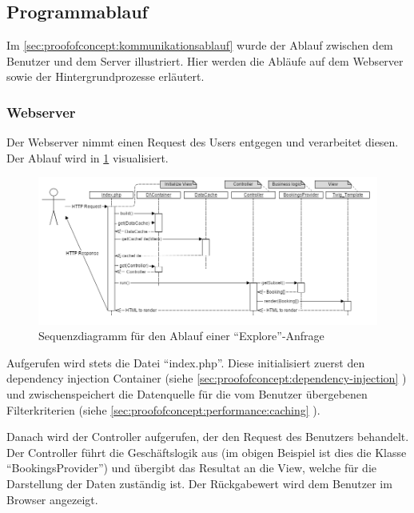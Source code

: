\subsection{Programmablauf}
\label{sec:proofofconcept:programmablauf}
Im \cref{sec:proofofconcept:kommunikationsablauf} wurde der Ablauf zwischen dem Benutzer und dem Server illustriert. Hier werden die Abläufe auf dem Webserver sowie der Hintergrundprozesse erläutert.

\subsubsection{Webserver}
\label{sec:proofofconcept:architektur:webserver}
Der Webserver nimmt einen Request des Users entgegen und verarbeitet diesen. Der Ablauf wird in \cref{fig:proofofconcept:architektur:webserver:1} visualisiert.

\begin{figure}[H]
	\centering
	\includegraphics[width=1\textwidth]{images/diagram-sequence-controllers}
	\caption{Sequenzdiagramm für den Ablauf einer "`Explore"'-Anfrage}
	\label{fig:proofofconcept:architektur:webserver:1}
\end{figure}

Aufgerufen wird stets die Datei "`index.php"'. Diese initialisiert zuerst den dependency injection Container (siehe \cref{sec:proofofconcept:dependency-injection} ) und zwischenspeichert die Datenquelle für die vom Benutzer übergebenen Filterkriterien (siehe \cref{sec:proofofconcept:performance:caching} ).

Danach wird der Controller aufgerufen, der den Request des Benutzers behandelt. Der Controller führt die Geschäftslogik aus (im obigen Beispiel ist dies die Klasse "`BookingsProvider"') und übergibt das Resultat an die View, welche für die Darstellung der Daten zuständig ist. Der Rückgabewert wird dem Benutzer im Browser angezeigt.

